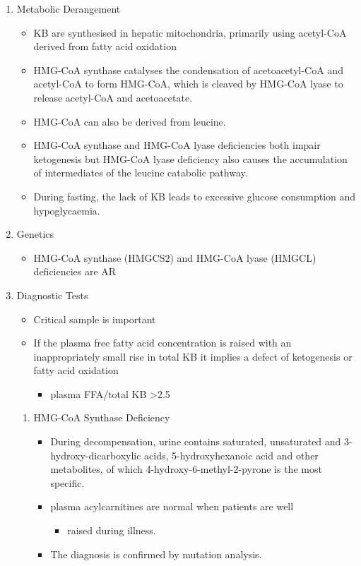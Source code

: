 \documentclass{scrartcl}
\begin{document}
\begin{enumerate}
\item Metabolic Derangement
\label{sec:orga8aff35}
\begin{itemize}
\item KB are synthesised in hepatic mitochondria, primarily using
acetyl-CoA derived from fatty acid oxidation
\item HMG-CoA synthase catalyses the condensation of acetoacetyl-CoA and
acetyl-CoA to form HMG-CoA, which is cleaved by HMG-CoA lyase to
release acetyl-CoA and acetoacetate.
\item HMG-CoA can also be derived from leucine.
\item HMG-CoA synthase and HMG-CoA lyase deficiencies both impair
ketogenesis but HMG-CoA lyase deficiency also causes the
accumulation of intermediates of the leucine catabolic pathway.
\item During fasting, the lack of KB leads to excessive glucose
consumption and hypoglycaemia.
\end{itemize}

\item Genetics
\label{sec:org8eea656}
\begin{itemize}
\item HMG-CoA synthase (HMGCS2) and HMG-CoA lyase (HMGCL) deficiencies are
AR
\end{itemize}

\item Diagnostic Tests
\label{sec:org0493ace}
\begin{itemize}
\item Critical sample is important
\item If the plasma free fatty acid concentration is raised with an
inappropriately small rise in total KB it implies a defect of
ketogenesis or fatty acid oxidation 
\begin{itemize}
\item plasma FFA/total KB >2.5
\end{itemize}
\end{itemize}

\begin{enumerate}
\item HMG-CoA Synthase Deficiency
\label{sec:orgce9623b}
\begin{itemize}
\item During decompensation, urine contains saturated, unsaturated and
3-hydroxy-dicarboxylic acids, 5-hydroxyhexanoic acid and other
metabolites, of which 4-hydroxy-6-methyl-2-pyrone is the most
specific.
\item plasma acylcarnitines are normal when patients are well
\begin{itemize}
\item raised during illness.
\end{itemize}
\item The diagnosis is confirmed by mutation analysis.
\end{itemize}


\end{enumerate}
\end{enumerate}
\end{document}
